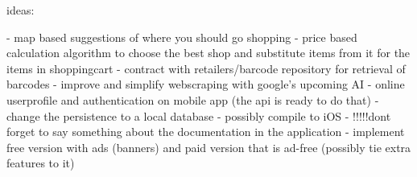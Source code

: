 ideas:

- map based suggestions of where you should go shopping
- price based calculation algorithm to choose the best shop and substitute items from it for the items in shoppingcart
- contract with retailers/barcode repository for retrieval of barcodes
- improve and simplify webscraping with google's upcoming AI
- online userprofile and authentication on mobile app (the api is ready to do that)
- change the persistence to a local database
- possibly compile to iOS
- !!!!!dont forget to say something about the documentation in the application
- implement free version with ads (banners) and paid version that is ad-free (possibly tie extra features to it)

